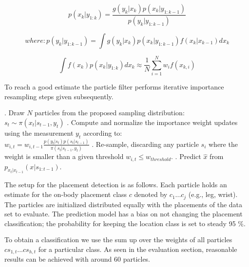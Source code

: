 \begin{equation}
    p(x_k|y_{1:k}) = \frac{g(y_k|x_k) p(x_k|y_{1:k-1})}{ p(y_k|y_{1:k-1})}
\label{b:eq2}
\end{equation}

\begin{equation}
    where: p(y_k|y_{1:k-1}) = \int g(y_k|x_k) p(x_k|y_{1:k-1}) f(x_k|x_{k-1}) dx_k
\label{b:eq3}
\end{equation}


\begin{equation}
    \int f(x_k)p(x_k|y_{1:k})dx_k\approx\frac1N\sum_{i=1}^Nw_{i}f(x_{k,i}) 
    \label{pf:eq4}
\end{equation}



To reach a good estimate the particle filter performs iterative importance resampling steps given subsequently.
\begin{algorithmic}
. Draw $N$ particles from the proposed sampling distribution:\\$ s_t \sim \pi(x_{t}|s_{t-1},y_{t}) $
. Compute and normalize the importance weight updates using the measurement $y_t$ according to: \\
${w}_{i,t} = w_{i,t-1} \frac{p(y_t|s_t) p(s_t|s_{t-1})} {\pi(s_t|s_{t-1},y_t)}$ 
. Re-sample, discarding any particle $s_i$ where the weight is smaller than a given threshold $w_{i,t} \leq w_{threshold}$.
. Predict $\hat{x}$ from $p_{x_t|x_{t-1}}(x|s_{1:t-1})$. 
\ENDFOR
\end{algorithmic}

The setup for the placement detection is as follows.
Each particle holds an estimate for the on-body placement class $c$ denoted by $c_1 ... c_j$ (e.g., leg, wrist).
The particles are initialized distributed equally with the placements of the data
set to evaluate.  The prediction model has a bias on not changing the
placement classification; the probability for keeping the location
class is set to steady 95 \%. 

To obtain a classification we use the
sum up over the weights of all particles $cs_{1,t} ...cs_{h,t}$ for a particular class.  As
seen in the evaluation section, reasonable results can be achieved
with around 60 particles.  


